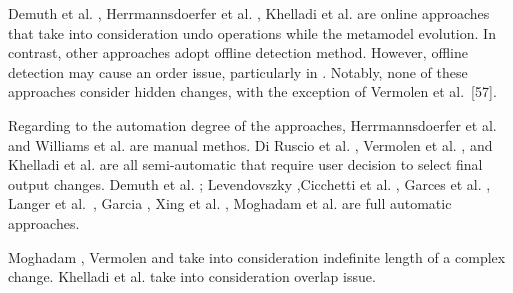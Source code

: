 Demuth et al. \cite{demuth2015constraint}, Herrmannsdoerfer et al. \cite{herrmannsdoerfer2009cope}, Khelladi et al. \cite{khelladi2016detecting} are online approaches that take into consideration undo operations while the metamodel evolution.
In contrast, other approaches \cite{williams2012searching,10.1145/2000410.2000416,levendovszky2014semi,garces2009managing,cicchetti_managing_2009,langer_posteriori_2013,garcia2012model,xing2006refactoring,moghadam2012automated,vermolen_reconstructing_2012} adopt offline detection method. However,  offline detection may cause an order issue, particularly in \cite{williams2012searching,10.1145/2000410.2000416,levendovszky2014semi,garces2009managing,langer_posteriori_2013,garcia2012model,xing2006refactoring,moghadam2012automated}. Notably, none of these approaches consider hidden changes, with the exception of Vermolen et al.~[57].


Regarding to the automation degree of the approaches, Herrmannsdoerfer et al. \cite{herrmannsdoerfer2009cope} and
Williams et al. \cite{williams2012searching} are manual methos. Di Ruscio et al. \cite{10.1145/2000410.2000416}, Vermolen et al. \cite{vermolen_reconstructing_2012}, and Khelladi et al. \cite{khelladi2016detecting} are all semi-automatic that require user decision to select final output changes.
Demuth et al. \cite{demuth2015constraint}; Levendovszky \cite{levendovszky2014semi},Cicchetti et al. \cite{cicchetti_managing_2009}, Garces et al. \cite{garces2009managing}, Langer et al.~\cite{langer_posteriori_2013}, Garcia \cite{garcia2012model}, Xing  et al. \cite{xing2006refactoring}, Moghadam et al. \cite{moghadam2012automated} are full automatic approaches.




Moghadam \cite{moghadam2012automated}, Vermolen \cite{vermolen_reconstructing_2012} and \cite{khelladi2016detecting} take into consideration indefinite length of a complex change.
Khelladi et al. \cite{khelladi2016detecting} take into consideration overlap issue.


